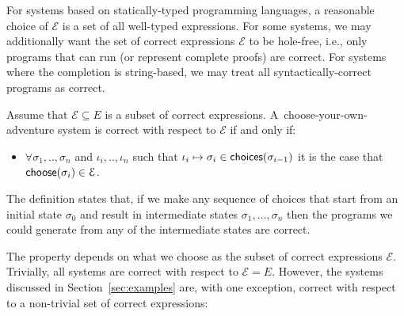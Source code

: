 \documentclass[a4paper,UKenglish,cleveref, autoref, thm-restate]{lipics-v2021}
\newcommand{\ident}[1]{\textsf{#1}}
\newcommand{\select}{\textnormal{\ident{choose}}}
\newcommand{\choices}{\textnormal{\ident{choices}}}
\begin{document}
For systems based on statically-typed programming languages, a reasonable choice of $\mathcal{E}$
is a set of all well-typed expressions. For some systems, we may additionally want the set
of correct expressions $\mathcal{E}$ to be hole-free, i.e., only programs that can run (or
represent complete proofs) are correct. For systems where the completion is string-based,
we may treat all syntactically-correct programs as correct.


\begin{definition}[Correctness]
Assume that $\mathcal{E}\subseteq E$ is a subset of correct expressions.
A~choose-your-own-adventure system is correct with respect to $\mathcal{E}$ if and only if:
\begin{itemize}
\item $\forall \sigma_1,..,\sigma_n$ and $\iota_i,..,\iota_n$ such that
  $\iota_i\mapsto\sigma_i \in \choices(\sigma_{i-1})$ it is the case
that $\select(\sigma_i) \in \mathcal{E}$.
\end{itemize}
\end{definition}

The definition states that, if we make any sequence of choices that start from an initial state
$\sigma_0$ and result in intermediate states $\sigma_1, \ldots, \sigma_n$ then the programs
we could generate from any of the intermediate states are correct.

The property depends on what we choose as the subset of correct expressions
$\mathcal{E}$. Trivially, all systems are correct with respect to $\mathcal{E}=E$.
However, the systems discussed in Section~\ref{sec:examples} are, with one exception,
correct with respect to a non-trivial set of correct expressions:
\end{document}
